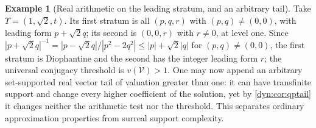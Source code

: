 \documentclass[11pt,letterpaper]{article}
\theoremstyle{definition}
\newtheorem{example}[example]{Example}
\theoremstyle{remark}
\numberwithin{equation}{section}
\begin{document}
\begin{example}[Real arithmetic on the leading stratum, and an arbitrary
tail]\label{dyn:ex:qpsqrt2}
Take $\Upsilon=(1,\sqrt2,t)$. Its first stratum is all $(p,q,r)$ with
$(p,q)\ne(0,0)$, with leading form $p+\sqrt2q$; its second is $(0,0,r)$
with $r\ne0$, at level one. Since
$|p+\sqrt2q|^{-1}=|p-\sqrt2q|/|p^{2}-2q^{2}|\le|p|+\sqrt2|q|$ for
$(p,q)\ne(0,0)$, the first stratum is Diophantine and the second has the
integer leading form $r$; the universal conjugacy threshold is
$v(\mathcal V)>1$. One may now append an arbitrary set-supported real
vector tail of valuation greater than one: it can have transfinite support
and change every higher coefficient of the solution, yet by
\cref{dyn:cor:qptail} it changes neither the arithmetic test nor the
threshold. This separates ordinary approximation properties from surreal
support complexity.
\end{example}
\end{document}
